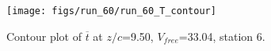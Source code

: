 \begin{figure}[H]
\centering
\texttt{[image: figs/run\_60/run\_60\_T\_contour]}
\caption{Contour plot of $\overline{t}$ at $z/c$=9.50, $V_{free}$=33.04, station 6.}
\label{fig:run_60_T_contour}
\end{figure}


